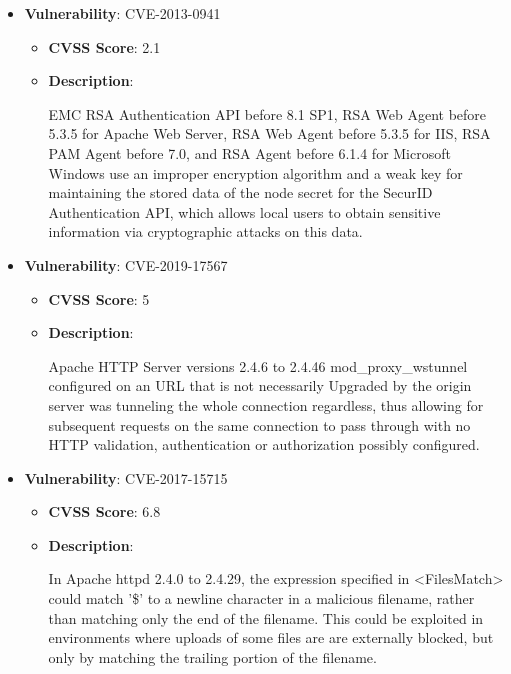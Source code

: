 \documentclass{article}
\begin{document}
\begin{itemize}
        \item \textbf{Vulnerability}: CVE-2013-0941
        \begin{itemize}
            \item \textbf{CVSS Score}:  2.1 
            \item \textbf{Description}:
            \parbox[t]{0.9\linewidth}{
                \ttfamily EMC RSA Authentication API before 8.1 SP1, RSA Web Agent before 5.3.5 for Apache Web Server, RSA Web Agent before 5.3.5 for IIS, RSA PAM Agent before 7.0, and RSA Agent before 6.1.4 for Microsoft Windows use an improper encryption algorithm and a weak key for maintaining the stored data of the node secret for the SecurID Authentication API, which allows local users to obtain sensitive information via cryptographic attacks on this data.
            }
        \end{itemize}
    
        \item \textbf{Vulnerability}: CVE-2019-17567
        \begin{itemize}
            \item \textbf{CVSS Score}:  5 
            \item \textbf{Description}:
            \parbox[t]{0.9\linewidth}{
                \ttfamily Apache HTTP Server versions 2.4.6 to 2.4.46 mod\_proxy\_wstunnel configured on an URL that is not necessarily Upgraded by the origin server was tunneling the whole connection regardless, thus allowing for subsequent requests on the same connection to pass through with no HTTP validation, authentication or authorization possibly configured.
            }
        \end{itemize}
    
        \item \textbf{Vulnerability}: CVE-2017-15715
        \begin{itemize}
            \item \textbf{CVSS Score}:  6.8 
            \item \textbf{Description}:
            \parbox[t]{0.9\linewidth}{
                \ttfamily In Apache httpd 2.4.0 to 2.4.29, the expression specified in <FilesMatch> could match '\$' to a newline character in a malicious filename, rather than matching only the end of the filename. This could be exploited in environments where uploads of some files are are externally blocked, but only by matching the trailing portion of the filename.
            }
        \end{itemize}
    

\end{itemize}
\end{document}

